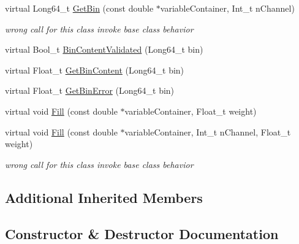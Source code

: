 \begin{DoxyCompactItemize}
\mbox{\label{classQn_1_1CorrectionProfile_ae670aae7149b53f64bf8461d1423f28d}} 
virtual Long64\+\_\+t \mbox{\hyperlink{classQn_1_1CorrectionProfile_ae670aae7149b53f64bf8461d1423f28d}{Get\+Bin}} (const double $\ast$variable\+Container, Int\+\_\+t n\+Channel)
\begin{DoxyCompactList}\small\item\em wrong call for this class invoke base class behavior \end{DoxyCompactList}\item 
virtual Bool\+\_\+t \mbox{\hyperlink{classQn_1_1CorrectionProfile_a299a9d176bfeeb1966bedad226c7c4b2}{Bin\+Content\+Validated}} (Long64\+\_\+t bin)
\item 
virtual Float\+\_\+t \mbox{\hyperlink{classQn_1_1CorrectionProfile_ad6a10a5dd59ba94e9853699e63d902d4}{Get\+Bin\+Content}} (Long64\+\_\+t bin)
\item 
virtual Float\+\_\+t \mbox{\hyperlink{classQn_1_1CorrectionProfile_a2253439bc16a7611449b07fcfced1b53}{Get\+Bin\+Error}} (Long64\+\_\+t bin)
\item 
virtual void \mbox{\hyperlink{classQn_1_1CorrectionProfile_a93b95da0e85f546097075ac1958e84e6}{Fill}} (const double $\ast$variable\+Container, Float\+\_\+t weight)
\item 
\mbox{\label{classQn_1_1CorrectionProfile_affeee38c64b7cf980278209d6f50dca1}} 
virtual void \mbox{\hyperlink{classQn_1_1CorrectionProfile_affeee38c64b7cf980278209d6f50dca1}{Fill}} (const double $\ast$variable\+Container, Int\+\_\+t n\+Channel, Float\+\_\+t weight)
\begin{DoxyCompactList}\small\item\em wrong call for this class invoke base class behavior \end{DoxyCompactList}\end{DoxyCompactItemize}
\subsection*{Additional Inherited Members}


\subsection{Constructor \& Destructor Documentation}
\mbox{\label{classQn_1_1CorrectionProfile_a509dc83514bf4e9a0aedcd37d98de4ed}} 
